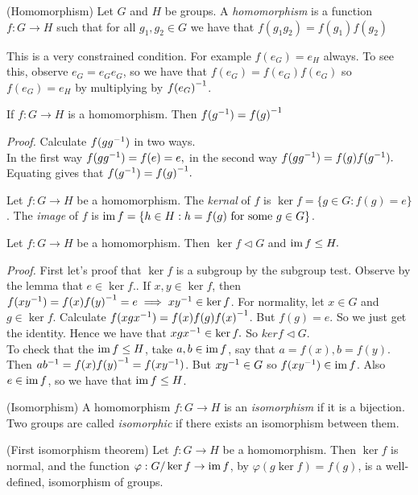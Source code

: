 \documentclass{article}
\newcommand{\nrm}{\triangleleft}
\begin{document}
\begin{itemize}
\begin{definition}
	(Homomorphism) Let $ G $ and $ H $ be groups. A \textit{homomorphism} is a function $ f: G\rightarrow H $ such that for all $ g_1,g_2\in G $ we have that $ f(g_1g_2)=f(g_1)f(g_2) $
\end{definition}
This is a very constrained condition. For example $ f(e_G)=e_H $ always. To see this, observe $ e_G=e_Ge_G $, so we have that $ f(e_G)=f(e_G)f(e_G) $ so $ f(e_G)=e_H $ by multiplying by $ {f(e_G)}^{-1} $.
\begin{lemma}
	If $ f:G\rightarrow H $ is a homomorphism. Then $ f({g}^{-1})={f(g)}^{-1} $
\end{lemma}
\textit{Proof.} Calculate $ f(g{g}^{-1}) $ in two ways.\\
	In the first way $ f(g{g}^{-1})=f(e)=e, $ in the second way $ f(g{g}^{-1})=f(g)f({g}^{-1}). $\\
Equating gives that $ f({g}^{-1})={f(g)}^{-1}. $
\begin{definition}
	Let $ f:G\rightarrow H $ be a homomorphism. The \textit{kernal} of $ f $ is $ \ker f =\{g\in G: f(g)=e\} $. The \textit{image} of $ f $ is $ \operatorname{im} f=\{ h\in H: h=f(g)\text{ for some } g\in G\} $.
	\end{definition}
\begin{proposition}
	Let $ f:G\rightarrow H $ be a homomorphism. Then $ \ker f \triangleleft G $ and $ \operatorname{im} f \le H.$
\end{proposition}
\textit{Proof.} First let's proof that $ \ker f $ is a subgroup by the subgroup test. Observe by the lemma that $ e\in\ker f. $. If $ x,y \in\ker f $, then $ f(x{y}^{-1})=f(x){f(y)}^{-1}=e\implies x{y}^{-1}\in \ker f $. For normality, let $ x\in G $ and $ g\in\ker f $. Calculate $ f(xg{x}^{-1})=f(x)f(g){f(x)}^{-1} $. But $ f(g)=e $. So we just get the identity. Hence we have that $ xg{x}^{-1}\in\ker f. $ So $ ker f\nrm G $.\\
	To check that the $ \operatorname{im} f \le H $, take $ a,b\in \operatorname{im} f $, say that $ a=f(x), b=f(y) $. Then $ a{b}^{-1}=f(x){f(y)}^{-1}=f(x{y}^{-1}) $. But $ x{y}^{-1}\in G $ so $ f(x{y}^{-1})\in \operatorname{im} f $. Also $ e\in \operatorname{im} f $, so we have that $ \operatorname{im} f\le H $.
\begin{definition}
	(Isomorphism) A homomorphism $ f:G\rightarrow H $ is an \textit{isomorphism} if it is a bijection. Two groups are called \textit{isomorphic} if there exists an isomorphism between them.
\end{definition}
\begin{theorem}
	(First isomorphism theorem) Let $ f:G\to H $ be a homomorphism. Then $ \ker f $ is normal, and the function $ \varphi:G/\ker f\rightarrow \operatorname{im} f $, by $ \varphi(g\ker f)=f(g) $, is a well-defined, isomorphism of groups.

\end{theorem}
\end{itemize}
\end{document}

